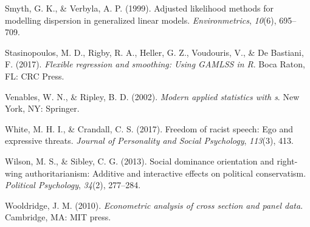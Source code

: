 \documentclass[english,man]{apa6}
\newcounter{author}
\theoremstyle{definition}
\theoremstyle{definition}
\theoremstyle{remark}
\begin{document}
\hypertarget{ref-smyth1999adjusted}{}
Smyth, G. K., \& Verbyla, A. P. (1999). Adjusted likelihood methods for
modelling dispersion in generalized linear models.
\emph{Environmetrics}, \emph{10}(6), 695--709.

\hypertarget{ref-stasinopoulos2017flexible}{}
Stasinopoulos, M. D., Rigby, R. A., Heller, G. Z., Voudouris, V., \& De
Bastiani, F. (2017). \emph{Flexible regression and smoothing: Using
GAMLSS in R}. Boca Raton, FL: CRC Press.

\hypertarget{ref-venables2002modern}{}
Venables, W. N., \& Ripley, B. D. (2002). \emph{Modern applied
statistics with s}. New York, NY: Springer.

\hypertarget{ref-white2017freedom}{}
White, M. H. I., \& Crandall, C. S. (2017). Freedom of racist speech:
Ego and expressive threats. \emph{Journal of Personality and Social
Psychology}, \emph{113}(3), 413.

\hypertarget{ref-wilson2013social}{}
Wilson, M. S., \& Sibley, C. G. (2013). Social dominance orientation and
right-wing authoritarianism: Additive and interactive effects on
political conservatism. \emph{Political Psychology}, \emph{34}(2),
277--284.

\hypertarget{ref-wooldridge2010econometric}{}
Wooldridge, J. M. (2010). \emph{Econometric analysis of cross section
and panel data}. Cambridge, MA: MIT press.
\end{document}
